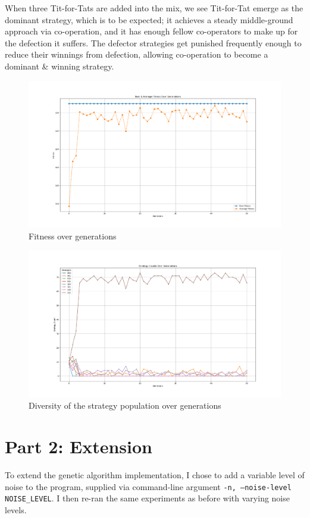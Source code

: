 \documentclass[a4paper]{article}
\begin{document}
When three Tit-for-Tats are added into the mix, we see Tit-for-Tat emerge as the dominant strategy, which is to be expected;
it achieves a steady middle-ground approach via co-operation, and it has enough fellow co-operators to make up for the defection it suffers.
The defector strategies get punished frequently enough to reduce their winnings from defection, allowing co-operation to become a dominant \& winning strategy.

\begin{figure}[H]
    \centering
    \includegraphics[width=\textwidth]{./images/tit_fitness.png}
    \caption{Fitness over generations}
\end{figure}

\begin{figure}[H]
    \centering
    \includegraphics[width=\textwidth]{./images/tit_strats.png}
    \caption{Diversity of the strategy population over generations}
\end{figure}

\section{Part 2: Extension}
To extend the genetic algorithm implementation, I chose to add a variable level of noise to the program, supplied via command-line argument \texttt{-n, --noise-level NOISE_LEVEL}. 
I then re-ran the same experiments as before with varying noise levels.
\end{document}
